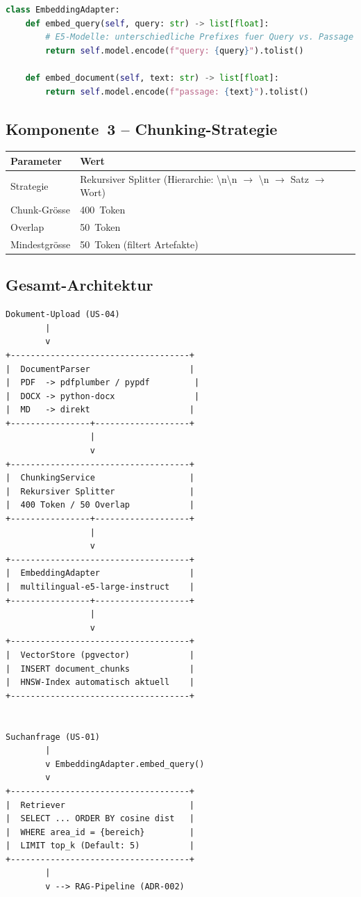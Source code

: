 \documentclass[a4paper, 11pt, oneside]{report}
\begin{document}
\begin{lstlisting}[language=Python]
class EmbeddingAdapter:
    def embed_query(self, query: str) -> list[float]:
        # E5-Modelle: unterschiedliche Prefixes fuer Query vs. Passage
        return self.model.encode(f"query: {query}").tolist()

    def embed_document(self, text: str) -> list[float]:
        return self.model.encode(f"passage: {text}").tolist()
\end{lstlisting}

\subsection{Komponente~3 -- Chunking-Strategie}

\begin{table}[htb]
\small\centering
\begin{tabular}{@{}ll@{}}
\toprule
\rowcolor{tabhead}
\textbf{Parameter} & \textbf{Wert} \\
\midrule
Strategie       & Rekursiver Splitter (Hierarchie: \textbackslash n\textbackslash n $\to$ \textbackslash n $\to$ Satz $\to$ Wort) \\
Chunk-Grösse    & 400~Token \\
Overlap         & 50~Token \\
Mindestgrösse   & 50~Token (filtert Artefakte) \\
\bottomrule
\end{tabular}
\end{table}

\subsection{Gesamt-Architektur}

\begin{lstlisting}[style=diagram]
Dokument-Upload (US-04)
        |
        v
+------------------------------------+
|  DocumentParser                    |
|  PDF  -> pdfplumber / pypdf         |
|  DOCX -> python-docx                |
|  MD   -> direkt                    |
+----------------+-------------------+
                 |
                 v
+------------------------------------+
|  ChunkingService                   |
|  Rekursiver Splitter               |
|  400 Token / 50 Overlap            |
+----------------+-------------------+
                 |
                 v
+------------------------------------+
|  EmbeddingAdapter                  |
|  multilingual-e5-large-instruct    |
+----------------+-------------------+
                 |
                 v
+------------------------------------+
|  VectorStore (pgvector)            |
|  INSERT document_chunks            |
|  HNSW-Index automatisch aktuell    |
+------------------------------------+


Suchanfrage (US-01)
        |
        v EmbeddingAdapter.embed_query()
        v
+------------------------------------+
|  Retriever                         |
|  SELECT ... ORDER BY cosine dist   |
|  WHERE area_id = {bereich}         |
|  LIMIT top_k (Default: 5)          |
+------------------------------------+
        |
        v --> RAG-Pipeline (ADR-002)
\end{lstlisting}
\end{document}
